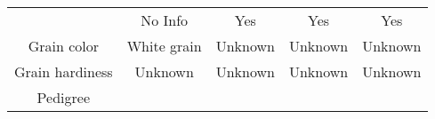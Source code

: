 \documentclass[]{article}
\begin{document}
\begin{longtable}[]{@{}ccccc@{}}
\begin{minipage}[t]{0.06\columnwidth}
\end{minipage} & \begin{minipage}[t]{0.08\columnwidth}\centering\strut
No Info\strut
\end{minipage} & \begin{minipage}[t]{0.11\columnwidth}\centering\strut
Yes\strut
\end{minipage} & \begin{minipage}[t]{0.08\columnwidth}\centering\strut
Yes\strut
\end{minipage} & \begin{minipage}[t]{0.12\columnwidth}\centering\strut
Yes\strut
\end{minipage}\tabularnewline
\begin{minipage}[t]{0.06\columnwidth}\centering\strut
Grain color\strut
\end{minipage} & \begin{minipage}[t]{0.08\columnwidth}\centering\strut
White grain\strut
\end{minipage} & \begin{minipage}[t]{0.11\columnwidth}\centering\strut
Unknown\strut
\end{minipage} & \begin{minipage}[t]{0.08\columnwidth}\centering\strut
Unknown\strut
\end{minipage} & \begin{minipage}[t]{0.12\columnwidth}\centering\strut
Unknown\strut
\end{minipage}\tabularnewline
\begin{minipage}[t]{0.06\columnwidth}\centering\strut
Grain hardiness\strut
\end{minipage} & \begin{minipage}[t]{0.08\columnwidth}\centering\strut
Unknown\strut
\end{minipage} & \begin{minipage}[t]{0.11\columnwidth}\centering\strut
Unknown\strut
\end{minipage} & \begin{minipage}[t]{0.08\columnwidth}\centering\strut
Unknown\strut
\end{minipage} & \begin{minipage}[t]{0.12\columnwidth}\centering\strut
Unknown\strut
\end{minipage}\tabularnewline
\begin{minipage}[t]{0.06\columnwidth}\centering\strut
Pedigree\strut
\end{minipage} & \begin{minipage}[t]{0.08\columnwidth}\centering\strut

\end{minipage}
\end{longtable}
\end{document}
